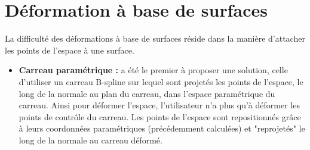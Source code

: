 \section{Déformation à base de surfaces}
La difficulté des déformations à base de surfaces réside dans la
manière d'attacher les points de l'espace à une surface.

\begin{itemize}
\item{\textbf{Carreau paramétrique :}} \cite{JLQ96} a été le premier à
  proposer une solution, celle d'utiliser un carreau B-spline sur
  lequel sont projetés les points de l'espace, le long de la normale
  au plan du carreau, dans l'espace paramétrique du carreau. Ainsi
  pour déformer l'espace, l'utilisateur n'a plus qu'à déformer les
  points de contrôle du carreau. Les points de l'espace sont
  repositionnés grâce à leurs coordonnées paramétriques (précédemment
  calculées) et "reprojetés" le long de la normale au carreau déformé.

\end{itemize}
